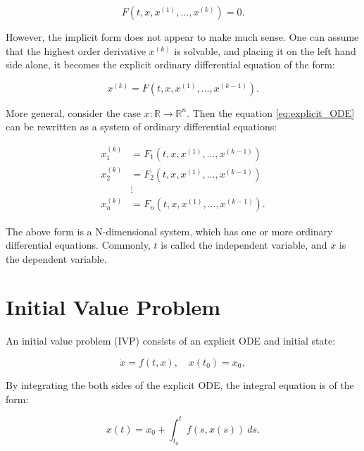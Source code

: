 \documentclass[
	parskip, 			   %
	twoside, 			   %
	DIV=14, 			   %
	BCOR=15.0mm, 		   %
	headsepline, 		   %
	open=right, 		   %
	captions=tableheading, %
	bibliography=totoc,    %
	numbers=noenddot       %
]{scrreprt}
\begin{document}
\begin{equation}
    \label{eq:implicit_ODE}
    F\left(t, x, x^{(1)}, \ldots, x^{(k)}\right)=0.
\end{equation}

However, the implicit form does not appear to make much sense. One can assume that the highest order derivative $x^{(k)}$ is solvable, and placing it on the left hand side alone, it becomes the explicit ordinary differential equation of the form:

\begin{equation}
    \label{eq:explicit_ODE}
    x^{(k)} = F\left(t, x, x^{(1)}, \ldots, x^{(k-1)}\right).
\end{equation}

More general, consider the case $x: \mathbb{R} \rightarrow \mathbb{R}^{n}$. Then the equation \ref{eq:explicit_ODE} can be rewritten as a system of ordinary differential equations:

\begin{equation}
    \label{eq:ODE_system}
    \begin{aligned}
    x_{1}^{(k)} &=F_{1}\left(t, x, x^{(1)}, \ldots, x^{(k-1)}\right) \\
    x_{2}^{(k)} &=F_{2}\left(t, x, x^{(1)}, \ldots, x^{(k-1)}\right) \\
    & \vdots \\
    x_{n}^{(k)} &=F_{n}\left(t, x, x^{(1)}, \ldots, x^{(k-1)}\right).
\end{aligned}
\end{equation}

The above form is a N-dimensional system, which has one or more ordinary differential equations. Commonly, $t$ is called the independent variable, and $x$ is the dependent variable.

\section{Initial Value Problem}
An initial value problem (IVP) consists of an explicit ODE and initial state:

\begin{equation}
    \label{eq:IVP}
    \dot{x} = f(t, x), \quad x(t_{0})=x_{0},
\end{equation}

By integrating the both sides of the explicit ODE, the integral equation is of the form:

\begin{equation}
    \label{eq:solution_IVP}
    x(t) = x_{0} + \int_{t_{0}}^{t} f(s, x(s))\:ds.
\end{equation}
\end{document}
